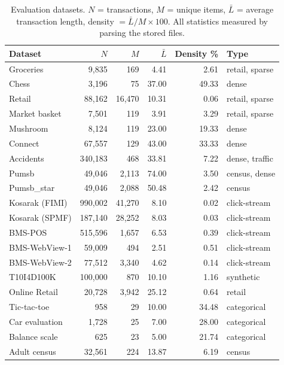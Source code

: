 \documentclass[twocolumn,10pt]{article}
\makeatletter
\newcommand\captionof[1]{\def\@captype{#1}\caption}
\makeatother
\begin{document}
\begin{table}[t]
\centering
\begin{minipage}[t]{0.58\textwidth}
\captionof{table}{Evaluation datasets. $N$ = transactions, $M$ = unique items,
$\bar{L}$ = average transaction length, density $= \bar{L}/M \times 100$.
All statistics measured by parsing the stored files.}
\label{tab:data}
\vspace{0.3em}
\footnotesize
\setlength{\tabcolsep}{2.5pt}
\begin{tabular}{lrrrrl}
\toprule
Dataset & $N$ & $M$ & $\bar{L}$ & Density \% & Type \\
\midrule
Groceries & 9,835 & 169 & 4.41 & 2.61 & retail, sparse \\
Chess & 3,196 & 75 & 37.00 & 49.33 & dense \\
Retail & 88,162 & 16,470 & 10.31 & 0.06 & retail, sparse \\
Market basket & 7,501 & 119 & 3.91 & 3.29 & retail, sparse \\
Mushroom & 8,124 & 119 & 23.00 & 19.33 & dense \\
Connect & 67,557 & 129 & 43.00 & 33.33 & dense \\
Accidents & 340,183 & 468 & 33.81 & 7.22 & dense, traffic \\
Pumsb & 49,046 & 2,113 & 74.00 & 3.50 & census, dense \\
Pumsb\_star & 49,046 & 2,088 & 50.48 & 2.42 & census \\
Kosarak (FIMI) & 990,002 & 41,270 & 8.10 & 0.02 & click-stream \\
Kosarak (SPMF) & 187,140 & 28,252 & 8.03 & 0.03 & click-stream \\
BMS-POS & 515,596 & 1,657 & 6.53 & 0.39 & click-stream \\
BMS-WebView-1 & 59,009 & 494 & 2.51 & 0.51 & click-stream \\
BMS-WebView-2 & 77,512 & 3,340 & 4.62 & 0.14 & click-stream \\
T10I4D100K & 100,000 & 870 & 10.10 & 1.16 & synthetic \\
Online Retail & 20,728 & 3,942 & 25.12 & 0.64 & retail \\
Tic-tac-toe & 958 & 29 & 10.00 & 34.48 & categorical \\
Car evaluation & 1,728 & 25 & 7.00 & 28.00 & categorical \\
Balance scale & 625 & 23 & 5.00 & 21.74 & categorical \\
Adult census & 32,561 & 224 & 13.87 & 6.19 & census \\

\end{tabular}
\end{minipage}
\end{table}
\end{document}
